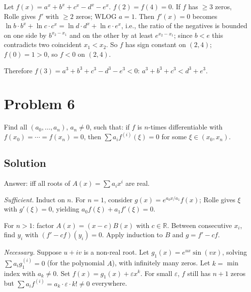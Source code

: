\documentclass{article}
\begin{document}
Let $f(x) = a^x + b^x + c^x - d^x - e^x$. $f(2) = f(4) = 0$. If $f$ has $\ge 3$ zeros, Rolle gives $f'$ with $\ge 2$ zeros; WLOG $a = 1$. Then $f'(x) = 0$ becomes $\ln b \cdot b^x + \ln c \cdot c^x = \ln d \cdot d^x + \ln e \cdot e^x$, i.e., the ratio of the negatives is bounded on one side by $b^{x_2 - x_1}$ and on the other by at least $e^{x_2 - x_1}$; since $b < e$ this contradicts two coincident $x_1 < x_2$. So $f$ has sign constant on $(2, 4)$; $f(0) = 1 > 0$, so $f < 0$ on $(2, 4)$.

Therefore $f(3) = a^3 + b^3 + c^3 - d^3 - e^3 < 0$: $a^3 + b^3 + c^3 < d^3 + e^3$.

\section*{Problem 6}
Find all $(a_0, \ldots, a_n)$, $a_n \ne 0$, such that: if $f$ is $n$-times differentiable with $f(x_0) = \cdots = f(x_n) = 0$, then $\sum a_i f^{(i)}(\xi) = 0$ for some $\xi \in (x_0, x_n)$.

\subsection*{Solution}
Answer: iff all roots of $A(x) = \sum a_i x^i$ are real.

\emph{Sufficient.} Induct on $n$. For $n = 1$, consider $g(x) = e^{a_0 x/a_1} f(x)$; Rolle gives $\xi$ with $g'(\xi) = 0$, yielding $a_0 f(\xi) + a_1 f'(\xi) = 0$.

For $n > 1$: factor $A(x) = (x - c) B(x)$ with $c \in \mathbb{R}$. Between consecutive $x_i$, find $y_i$ with $(f' - cf)(y_i) = 0$. Apply induction to $B$ and $g = f' - cf$.

\emph{Necessary.} Suppose $u + iv$ is a non-real root. Let $g_1(x) = e^{ux} \sin(vx)$, solving $\sum a_i g_1^{(i)} = 0$ (for the polynomial $A$), with infinitely many zeros. Let $k = $ min index with $a_k \ne 0$. Set $f(x) = g_1(x) + \varepsilon x^k$. For small $\varepsilon$, $f$ still has $n + 1$ zeros but $\sum a_i f^{(i)} = a_k \cdot \varepsilon \cdot k! \ne 0$ everywhere.
\end{document}
